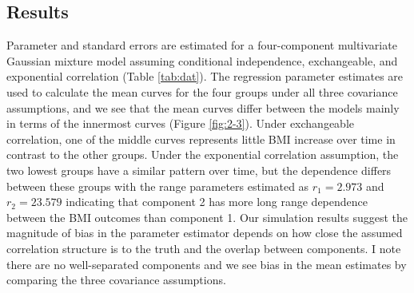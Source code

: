 \subsection{Results}
Parameter and standard errors are estimated for a four-component multivariate Gaussian mixture model assuming conditional independence, exchangeable, and exponential correlation (Table \ref{tab:dat}). The regression parameter estimates are used to calculate the mean curves for the four groups under all three covariance assumptions, and we see that the mean curves differ between the models mainly in terms of the innermost curves (Figure \ref{fig:2-3}).  Under exchangeable correlation, one of the middle curves represents little BMI increase over time in contrast to the other groups. Under the exponential correlation assumption, the two lowest groups have a similar pattern over time, but the dependence differs between these groups with the range parameters estimated as $r_1=2.973$ and $r_2=23.579$ indicating that component 2 has more long range dependence between the BMI outcomes than component 1. Our simulation results suggest the magnitude of bias in the parameter estimator depends on how close the assumed correlation structure is to the truth and the overlap between components. I note there are no well-separated components and we see bias in the mean estimates by comparing the three covariance assumptions. 
